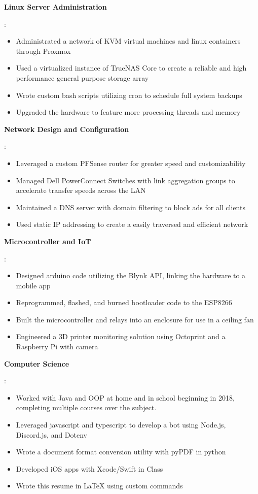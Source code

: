 \documentclass[letterpaper,11pt]{article}
\newcommand{\resumeItem}[2]{
  \item\small{
    \textbf{#1}{: #2 \vspace{-2pt}}
  }
}
\begin{document}
  \resumeItem{Linux Server Administration}
  {
    \begin{itemize}
      \item Administrated a network of KVM virtual machines and linux containers through Proxmox
      \item Used a virtualized instance of TrueNAS Core to create a reliable and high performance general purpose storage array
      \item Wrote custom bash scripts utilizing cron to schedule full system backups
      \item Upgraded the hardware to feature more processing threads and memory
  \end{itemize}
}
  \resumeItem{Network Design and Configuration}
  { 
  \begin{itemize}
      \item Leveraged a custom PFSense router for greater speed and customizability
      \item Managed Dell PowerConnect Switches with link aggregation groups to accelerate transfer speeds across the LAN
      \item Maintained a DNS server with domain filtering to block ads for all clients
      \item Used static IP addressing to create a easily traversed and efficient network
  \end{itemize}
  }
  \resumeItem{Microcontroller and IoT}
  {
  \begin{itemize}
    \item Designed arduino code utilizing the Blynk API, linking the hardware to a mobile app
    \item Reprogrammed, flashed, and burned bootloader code to the ESP8266
    \item Built the microcontroller and relays into an enclosure for use in a ceiling fan
    \item Engineered a 3D printer monitoring solution using Octoprint and a Raspberry Pi with camera
  \end{itemize}
  }
  
  \resumeItem{Computer Science}
  {
  \begin{itemize}
    \item Worked with Java and OOP at home and in school beginning in 2018, completing multiple courses over the subject.
    \item Leveraged javascript and typescript to develop a bot using Node.js, Discord.js, and Dotenv
    \item Wrote a document format conversion utility with pyPDF in python 
    \item Developed iOS apps with Xcode/Swift in Class
    \item Wrote this resume in LaTeX using custom commands
  \end{itemize}}
  
\end{document}
